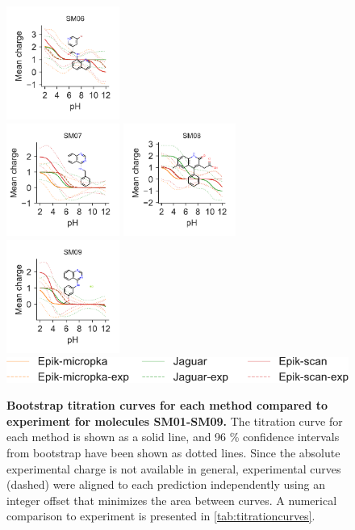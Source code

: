\documentclass[9pt,lineno,final]{elife}
\begin{document}
\begin{figure}[H]
	\includegraphics[width=0.33\textwidth]{Reports/SM06-titrationcurve-views.pdf}	 \\
		\includegraphics[width=0.33\textwidth]{Reports/SM07-titrationcurve-views.pdf}
	\includegraphics[width=0.33\textwidth]{Reports/SM08-titrationcurve-views.pdf}
	\includegraphics[width=0.33\textwidth]{Reports/SM09-titrationcurve-views.pdf}	 \\
	\includegraphics[]{Reports/overview-legend.pdf}
	\caption{{\bf Bootstrap titration curves for each method compared to experiment for molecules SM01-SM09.} The titration curve for each method is shown as a solid line, and 96 \% confidence intervals from bootstrap have been shown as dotted lines. Since the absolute experimental charge is not available in general, experimental curves (dashed) were aligned to each prediction independently using an integer offset that minimizes the area between curves. A numerical comparison to experiment is presented in \cref{tab:titrationcurves}.
	\label{fig:charge-curves1}}
	\end{figure}
	
\end{document}
